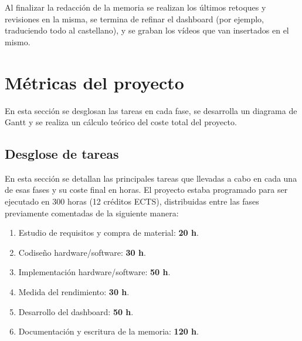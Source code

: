Al finalizar la redacción de la memoria se realizan los últimos retoques y revisiones en la misma, se termina de refinar el dashboard (por ejemplo, traduciendo todo al castellano), y se graban los vídeos que van insertados en el mismo.

\section{Métricas del proyecto}
En esta sección se desglosan las tareas en cada fase, se desarrolla un diagrama de Gantt y se realiza un cálculo teórico del coste total del proyecto.

\subsection{Desglose de tareas}
En esta sección se detallan las principales tareas que llevadas a cabo en cada una de esas fases y su coste final en horas. El proyecto estaba programado para ser ejecutado en  300 horas (12 créditos ECTS), distribuidas entre las fases previamente comentadas de la siguiente manera:

\begin{enumerate}
  \item Estudio de requisitos y compra de material: \textbf{20 h}.
  \item Codiseño hardware/software: \textbf{30 h}.
  \item Implementación hardware/software: \textbf{50 h}.
  \item Medida del rendimiento: \textbf{30 h}.
  \item Desarrollo del dashboard: \textbf{50 h}.
  \item Documentación y escritura de la memoria: \textbf{120 h}.
\end{enumerate}


